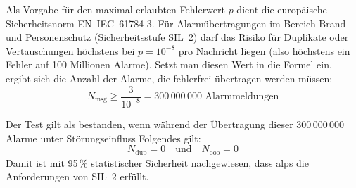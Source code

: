 Als Vorgabe für den maximal erlaubten Fehlerwert $p$ dient die europäische Sicherheitsnorm \mbox{EN IEC 61784-3}. Für Alarmübertragungen im Bereich Brand- und Personenschutz (Sicherheitsstufe \mbox{SIL 2}) darf das Risiko für Duplikate oder Vertauschungen höchstens bei $p = 10^{-8}$ pro Nachricht liegen (also höchstens ein Fehler auf 100 Millionen Alarme). Setzt man diesen Wert in die Formel ein, ergibt sich die Anzahl der Alarme, die fehlerfrei übertragen werden müssen:
\begin{equation}
    N_{\text{msg}} \ge \frac{3}{10^{-8}} = 300\,000\,000 \text{ Alarmmeldungen}
\end{equation}

Der Test gilt als bestanden, wenn während der Übertragung dieser $300\,000\,000$ Alarme unter Störungseinfluss Folgendes gilt:
\begin{equation}
    N_{\text{dup}} = 0 \quad \text{und} \quad N_{\text{ooo}} = 0
\end{equation}
Damit ist mit 95\,\% statistischer Sicherheit nachgewiesen, dass \gls{alps} die Anforderungen von \mbox{SIL 2} erfüllt.